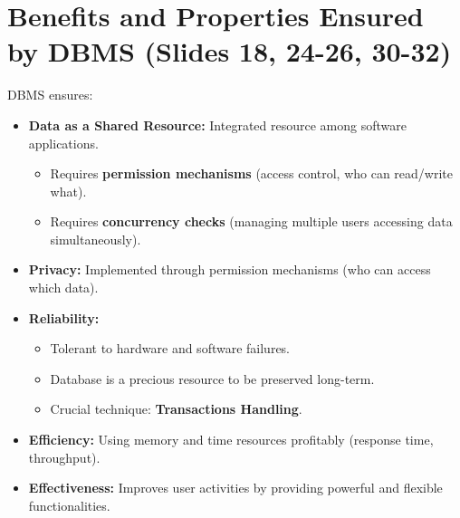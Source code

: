 \documentclass{article}
\begin{document}
	\section{Benefits and Properties Ensured by DBMS (Slides 18, 24-26, 30-32)}
	DBMS ensures:
	\begin{itemize}
		\item \textbf{Data as a Shared Resource:} Integrated resource among software applications.
		\begin{itemize}
			\item Requires \textbf{permission mechanisms} (access control, who can read/write what).
			\item Requires \textbf{concurrency checks} (managing multiple users accessing data simultaneously).
		\end{itemize}
		\item \textbf{Privacy:} Implemented through permission mechanisms (who can access which data).
		\item \textbf{Reliability:}
		\begin{itemize}
			\item Tolerant to hardware and software failures.
			\item Database is a precious resource to be preserved long-term.
			\item Crucial technique: \textbf{Transactions Handling}.
		\end{itemize}
		\item \textbf{Efficiency:} Using memory and time resources profitably (response time, throughput).
		\item \textbf{Effectiveness:} Improves user activities by providing powerful and flexible functionalities.
	\end{itemize}
	
\end{document}
